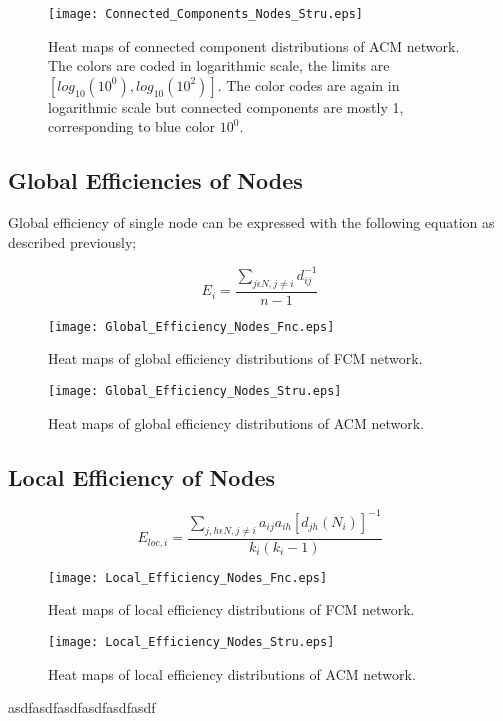 \documentclass[12pt]{article}
\begin{document}
\newpage

\begin{figure}[h!]
	\centering
	\texttt{[image: Connected\_Components\_Nodes\_Stru.eps]}
	\caption{Heat maps of connected component distributions of ACM network. The colors are coded in logarithmic scale, the limits are $[log_{10}(10^0), log_{10}(10^2)]$. The color codes are again in logarithmic scale but connected components are mostly 1, corresponding to blue color $10^0$.}
\end{figure} 

\newpage

\subsection{Global Efficiencies of Nodes}
Global efficiency of single node can be expressed with the following equation as described previously; 

\begin{equation}
 E_i =  \frac{\sum\limits_{j \epsilon N, j\neq i}d_{ij}^{-1}}{n-1 }
\end{equation}



\begin{figure}[h!]
	\centering
	\texttt{[image: Global\_Efficiency\_Nodes\_Fnc.eps]}
	\caption{Heat maps of global efficiency distributions of FCM network.}
\end{figure}

\newpage 


\begin{figure}[h!]
	\centering
	\texttt{[image: Global\_Efficiency\_Nodes\_Stru.eps]}
	\caption{Heat maps of global efficiency distributions of ACM network.}
\end{figure}

\newpage 

\subsection{Local Efficiency of Nodes}

\begin{equation}
 E_{loc,i} = \frac{\sum\limits_{j,h \epsilon N, j\neq i} a_{ij} a_{ih}[d_{jh}(N_i)]^{-1}}{k_i(k_i - 1) }
\end{equation}




\begin{figure}[h!]
	\centering
	\texttt{[image: Local\_Efficiency\_Nodes\_Fnc.eps]}
	\caption{Heat maps of local efficiency distributions of FCM network.}
\end{figure}

\begin{figure}[h!]
	\centering
	\texttt{[image: Local\_Efficiency\_Nodes\_Stru.eps]}
	\caption{Heat maps of local efficiency distributions of ACM network.}
\end{figure}

asdfasdfasdf\cite{RUB09}asdfasdfasdf

\clearpage



%
\end{document}
